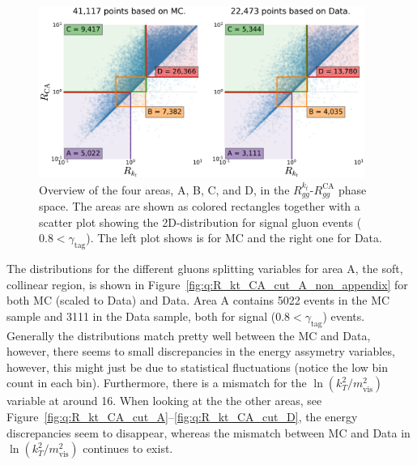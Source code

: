 \begin{figure}[h!]
  \centerfloat
  \includegraphics[width=0.95\textwidth, trim=0 0 0 0, clip]{figures/quarks/gtag-R_kt_CA_overview-down_sample=1.00-ML_vars=vertex-selection=b-ejet_min=4-n_iter_RS_lgb=99-n_iter_RS_xgb=9-cdot_cut=0.90-version=19-njet=4.pdf}
  \caption[Overview of the Four Areas in the $R_{gg}^{k_t}$-$R_{gg}^\mathrm{CA}$ Phase Space]
          {Overview of the four areas, A, B, C, and D, in the $R_{gg}^{k_t}$-$R_{gg}^\mathrm{CA}$ phase space. The areas are shown as colored rectangles together with a scatter plot showing the 2D-distribution for signal gluon events ($0.8 < \gamma_\mathrm{tag}$). The left plot shows is for MC and the right one for Data.} 
  \label{fig:q:R_kt_CA_overview}
\end{figure}

The distributions for the different gluons splitting variables for area A, the soft, collinear region, is shown in Figure~\ref{fig:q:R_kt_CA_cut_A_non_appendix} for both MC (scaled to Data) and Data. Area A contains \num{5022} events in the MC sample and \num{3111} in the Data sample, both for signal ($0.8 < \gamma_\mathrm{tag}$) events. Generally the distributions match pretty well between the MC and Data, however, there seems to small discrepancies in the energy assymetry variables, however, this might just be due to statistical fluctuations (notice the low bin count in each bin). Furthermore, there is a mismatch for the $\ln \left( k_T^2 / m_\mathrm{vis}^2 \right)$ variable at around \num{16}. When looking at the the other areas, see Figure~\ref{fig:q:R_kt_CA_cut_A}--\ref{fig:q:R_kt_CA_cut_D}, the energy discrepancies seem to disappear, whereas the mismatch between MC and Data in $\ln \left( k_T^2 / m_\mathrm{vis}^2 \right)$ continues to exist. 

